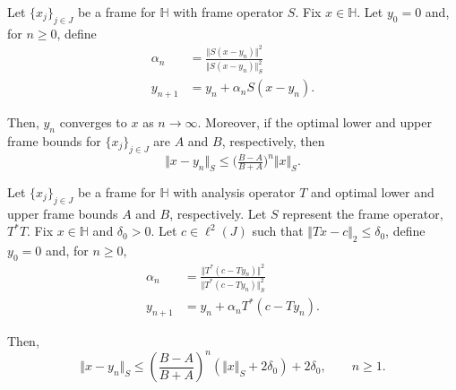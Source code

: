 \documentclass[10pt,a4paper]{amsart}
\begin{document}
\begin{theorem} \label{thm:greedy}
Let $\lbrace x_{j} \rbrace_{j\in J}$ be a frame for $\mathbb{H}$ with frame operator $S$.  Fix $x \in \mathbb{H}$.  Let $y_{0}=0$ and, for $n\ge 0$, define
\begin{equation} \label{eq:greedy}
\begin{aligned}
\alpha_{n} &= \frac{\Vert S(x-y_{n})\Vert^{2}}{\Vert S(x-y_{n})\Vert_{S}^{2}} \\[4pt]
y_{n+1} &= y_{n} + \alpha_{n} S(x-y_{n}).
\end{aligned}
\end{equation}

\noindent
Then, $y_{n}$ converges to $x$ as $n\rightarrow \infty$.  Moreover, if the optimal lower and upper frame bounds for $\lbrace x_{j} \rbrace_{j\in J}$ are $A$ and $B$, respectively, then
\begin{equation} \label{eq:greedy-bound}
\Vert x-y_{n} \Vert_{S} \le \big ( \tfrac{B-A}{B+A} \big )^{n} \Vert x \Vert_{S}.
\end{equation}
\end{theorem}

\begin{theorem} \label{thm:robust}
Let $\lbrace x_{j} \rbrace_{j\in J}$ be a frame for $\mathbb{H}$ with analysis operator $T$ and optimal lower and upper frame bounds $A$ and $B$, respectively.  Let $S$ represent the frame operator, $T^{*}T$.  Fix $x\in \mathbb{H}$ and $\delta_{0} >0$.  Let $c\in \ell^{2}(J)$ such that $\Vert Tx-c\Vert_{2} \le \delta_{0}$, define $y_{0}=0$ and, for $n\ge 0$, 
\begin{equation} \label{eq:greedy-2}
\begin{aligned}
\alpha_{n} &= \frac{\Vert T^{*}(c-Ty_{n})\Vert^{2}}{\Vert T^{*}(c-Ty_{n})\Vert_{S}^{2}} \\[4pt]
y_{n+1} &= y_{n} + \alpha_{n} T^{*}(c-Ty_{n}).
\end{aligned}
\end{equation}

\noindent
Then, 
\begin{equation} \label{eq:bound-2}
\Vert x-y_{n} \Vert_{S} \le \left ( \frac{B-A}{B+A} \right )^{n} \left ( \Vert x \Vert_{S} + 2\delta_{0}\right ) +  2\delta_{0}, \qquad n\ge 1.
\end{equation}
\end{theorem}
\end{document}
